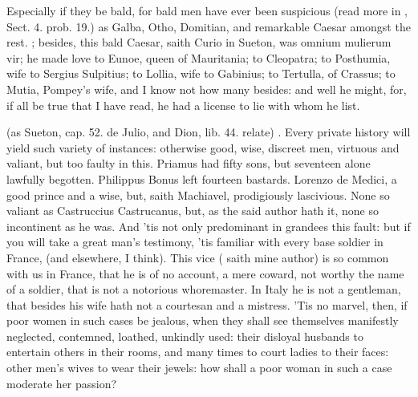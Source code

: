 Especially if they be bald, for bald men have ever been suspicious
(read more in \Aristotle, Sect. 4. prob. 19.) as Galba, Otho, Domitian,
and remarkable Caesar amongst the rest. ; besides, this bald Caesar, saith Curio in
Sueton, was omnium mulierum vir; he made love to Eunoe, queen of
Mauritania; to Cleopatra; to Posthumia, wife to Sergius Sulpitius; to
Lollia, wife to Gabinius; to Tertulla, of Crassus; to Mutia, Pompey's
wife, and I know not how many besides: and well he might, for, if all
be true that I have read, he had a license to lie with whom he list.

 (as Sueton, cap. 52. de Julio, and
Dion, lib. 44. relate) . Every private history will yield such variety of instances:
otherwise good, wise, discreet men, virtuous and valiant, but too
faulty in this. Priamus had fifty sons, but seventeen alone lawfully
begotten. Philippus Bonus left fourteen bastards. Lorenzo de
Medici, a good prince and a wise, but, saith Machiavel,
prodigiously lascivious. None so valiant as Castruccius
Castrucanus, but, as the said author hath it, none so incontinent
as he was. And 'tis not only predominant in grandees this fault: but if
you will take a great man's testimony, 'tis familiar with every base
soldier in France, (and elsewhere, I think). This vice ( saith
mine author) is so common with us in France, that he is of no account,
a mere coward, not worthy the name of a soldier, that is not a
notorious whoremaster. In Italy he is not a gentleman, that besides his
wife hath not a courtesan and a mistress. 'Tis no marvel, then, if poor
women in such cases be jealous, when they shall see themselves
manifestly neglected, contemned, loathed, unkindly used: their disloyal
husbands to entertain others in their rooms, and many times to court
ladies to their faces: other men's wives to wear their jewels: how
shall a poor woman in such a case moderate her passion? 

